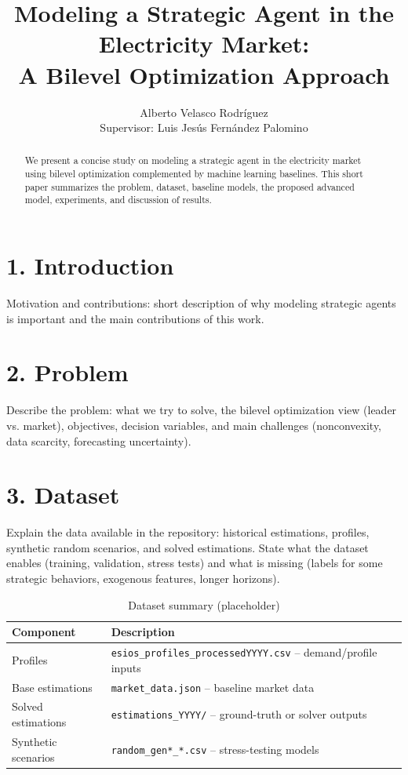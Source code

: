 \documentclass[twocolumn,10pt]{article}
\title{Modeling a Strategic Agent in the Electricity Market: \\
       A Bilevel Optimization Approach}
\author{Alberto Velasco Rodríguez \\ \small Supervisor: Luis Jesús Fernández Palomino}
\date{}
\begin{document}
\maketitle

\begin{abstract}
We present a concise study on modeling a strategic agent in the electricity market using bilevel optimization complemented by machine learning baselines. This short paper summarizes the problem, dataset, baseline models, the proposed advanced model, experiments, and discussion of results.
\end{abstract}

\section*{1. Introduction}
Motivation and contributions: short description of why modeling strategic agents is important and the main contributions of this work.

\section*{2. Problem}
Describe the problem: what we try to solve, the bilevel optimization view (leader vs. market), objectives, decision variables, and main challenges (nonconvexity, data scarcity, forecasting uncertainty).

\section*{3. Dataset}
Explain the data available in the repository: historical estimations, profiles, synthetic random scenarios, and solved estimations. State what the dataset enables (training, validation, stress tests) and what is missing (labels for some strategic behaviors, exogenous features, longer horizons).

\begin{table}[h]
\centering
\caption{Dataset summary (placeholder)}
\begin{tabular}{@{}p{} p{}@{}}
\toprule
Component & Description \\
\midrule
Profiles & \texttt{esios\_profiles\_processedYYYY.csv} -- demand/profile inputs \\
Base estimations & \texttt{market\_data.json} -- baseline market data \\
Solved estimations & \texttt{estimations\_YYYY/} -- ground-truth or solver outputs \\
Synthetic scenarios & \texttt{random\_gen*\_*.csv} -- stress-testing models \\
\bottomrule
\end{tabular}
\end{table}
\end{document}

